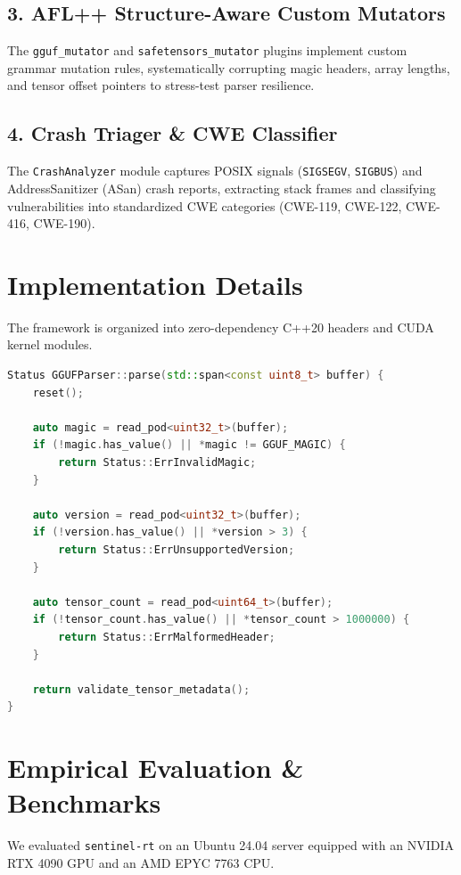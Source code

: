 \documentclass[11pt,a4paper]{article}
\begin{document}
\subsection{3. AFL++ Structure-Aware Custom Mutators}
The \texttt{gguf\_mutator} and \texttt{safetensors\_mutator} plugins implement custom grammar mutation rules, systematically corrupting magic headers, array lengths, and tensor offset pointers to stress-test parser resilience.

\subsection{4. Crash Triager \& CWE Classifier}
The \texttt{CrashAnalyzer} module captures POSIX signals (\texttt{SIGSEGV}, \texttt{SIGBUS}) and AddressSanitizer (ASan) crash reports, extracting stack frames and classifying vulnerabilities into standardized CWE categories (CWE-119, CWE-122, CWE-416, CWE-190).

\section{Implementation Details}

The framework is organized into zero-dependency C++20 headers and CUDA kernel modules.

\begin{lstlisting}[language=C++, caption={GGUF Parser Bounds-Checked Deserialization Logic}]
Status GGUFParser::parse(std::span<const uint8_t> buffer) {
    reset();

    auto magic = read_pod<uint32_t>(buffer);
    if (!magic.has_value() || *magic != GGUF_MAGIC) {
        return Status::ErrInvalidMagic;
    }

    auto version = read_pod<uint32_t>(buffer);
    if (!version.has_value() || *version > 3) {
        return Status::ErrUnsupportedVersion;
    }

    auto tensor_count = read_pod<uint64_t>(buffer);
    if (!tensor_count.has_value() || *tensor_count > 1000000) {
        return Status::ErrMalformedHeader;
    }

    return validate_tensor_metadata();
}
\end{lstlisting}

\section{Empirical Evaluation \& Benchmarks}

We evaluated \texttt{sentinel-rt} on an Ubuntu 24.04 server equipped with an NVIDIA RTX 4090 GPU and an AMD EPYC 7763 CPU.
\end{document}
